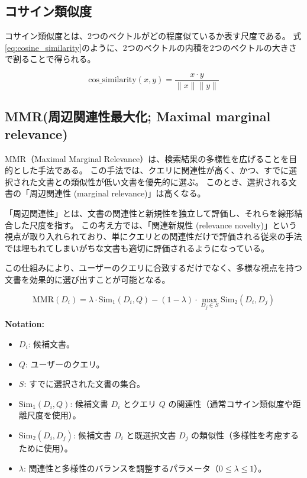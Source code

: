\subsection{コサイン類似度}
コサイン類似度とは、2つのベクトルがどの程度似ているか表す尺度である。
式\ref{eq:cosine_similarity}のように、2つのベクトルの内積を2つのベクトルの大きさで割ることで得られる。

\begin{equation}\label{eq:cosine_similarity}
 \text{cos\_similarity}(x, y) = \frac{x \cdot y}{\|x\| \|y\|}
\end{equation}

\subsection{MMR(周辺関連性最大化; Maximal marginal relevance)}
MMR（Maximal Marginal Relevance）\cite{carbonell1998use}は、検索結果の多様性を広げることを目的とした手法である。
この手法では、クエリに関連性が高く、かつ、すでに選択された文書との類似性が低い文書を優先的に選ぶ。
このとき、選択される文書の「周辺関連性 (marginal relevance)」は高くなる。

「周辺関連性」とは、文書の関連性と新規性を独立して評価し、それらを線形結合した尺度を指す。
この考え方では、「関連新規性 (relevance novelty)」という視点が取り入れられており、単にクエリとの関連性だけで評価される従来の手法では埋もれてしまいがちな文書も適切に評価されるようになっている。

この仕組みにより、ユーザーのクエリに合致するだけでなく、多様な視点を持つ文書を効果的に選び出すことが可能となる。

\begin{equation}
    \text{MMR}(D_i) = \lambda \cdot \text{Sim}_1(D_i, Q) - (1 - \lambda) \cdot \max_{D_j \in S} \text{Sim}_2(D_i, D_j)
\end{equation}

\noindent
\textbf{Notation:}
\begin{itemize}
    \item $D_i$: 候補文書。
    \item $Q$: ユーザーのクエリ。
    \item $S$: すでに選択された文書の集合。
    \item $\text{Sim}_1(D_i, Q)$: 候補文書 $D_i$ とクエリ $Q$ の関連性（通常コサイン類似度や距離尺度を使用）。
    \item $\text{Sim}_2(D_i, D_j)$: 候補文書 $D_i$ と既選択文書 $D_j$ の類似性（多様性を考慮するために使用）。
    \item $\lambda$: 関連性と多様性のバランスを調整するパラメータ（$0 \leq \lambda \leq 1$）。
\end{itemize}


